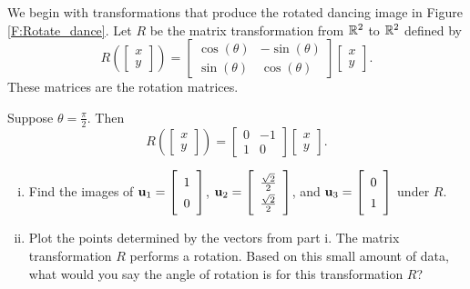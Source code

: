 \begin{pactivity} \label{act:1_g_rotation} We begin with transformations that produce the rotated dancing image in Figure \ref{F:Rotate_dance}. Let $R$ be the matrix transformation from $\mathbb{R}^2$ to $\mathbb{R}^2$ defined by 
\[R\left(\left[ \begin{array}{c} x \\ y \end{array} \right] \right) = \left[\begin{array}{lr} \cos(\theta) & -\sin(\theta) \\ \sin(\theta) & \cos(\theta) \end{array} \right]\left[ \begin{array}{c} x \\ y \end{array} \right]. \]
These matrices are the rotation matrices.
	\ba
	\item Suppose $\theta = \frac{\pi}{2}$. Then 
\[R\left(\left[ \begin{array}{c} x \\ y \end{array} \right] \right) = \left[ \begin{array}{cr} 0&-1 \\ 1&0 \end{array} \right] \left[ \begin{array}{c} x \\ y \end{array} \right]. \]
		\begin{enumerate}[i.]
		\item Find the images of $\vu_1 = \left[ \begin{array}{c} 1 \\ 0 \end{array} \right]$,  $\vu_2 = \left[ \renewcommand{\arraystretch}{1.4} \begin{array}{c} \frac{\sqrt{2}}{2} \\ \frac{\sqrt{2}}{2}  \end{array} \right]$, and $\vu_3 = \left[ \begin{array}{c} 0 \\ 1 \end{array} \right]$ under $R$.

		\item Plot the points determined by the vectors from part i. The matrix transformation $R$ performs a rotation. Based on this small amount of data, what would you say the angle of rotation is for this transformation $R$? 


\end{enumerate}
\end{pactivity}
